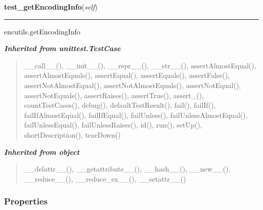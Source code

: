     \label{cssutils:tests:encutils:AutoEncodingTestCase:test_getEncodingInfo}

    \vspace{0.5ex}

\hspace{.8\funcindent}\begin{boxedminipage}{\funcwidth}

    \raggedright \textbf{test\_getEncodingInfo}(\textit{self})

    \vspace{-1.5ex}

    \rule{\textwidth}{0.5\fboxrule}
\setlength{\parskip}{2ex}
    encutils.getEncodingInfo

\setlength{\parskip}{1ex}
    \end{boxedminipage}


\large{\textbf{\textit{Inherited from unittest.TestCase}}}

\begin{quote}
\_\_call\_\_(), \_\_init\_\_(), \_\_repr\_\_(), \_\_str\_\_(), assertAlmostEqual(), assertAlmostEquals(), assertEqual(), assertEquals(), assertFalse(), assertNotAlmostEqual(), assertNotAlmostEquals(), assertNotEqual(), assertNotEquals(), assertRaises(), assertTrue(), assert\_(), countTestCases(), debug(), defaultTestResult(), fail(), failIf(), failIfAlmostEqual(), failIfEqual(), failUnless(), failUnlessAlmostEqual(), failUnlessEqual(), failUnlessRaises(), id(), run(), setUp(), shortDescription(), tearDown()
\end{quote}

\large{\textbf{\textit{Inherited from object}}}

\begin{quote}
\_\_delattr\_\_(), \_\_getattribute\_\_(), \_\_hash\_\_(), \_\_new\_\_(), \_\_reduce\_\_(), \_\_reduce\_ex\_\_(), \_\_setattr\_\_()
\end{quote}


  \subsubsection{Properties}


